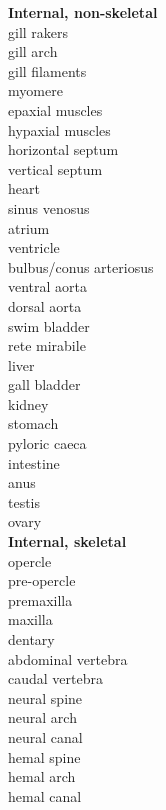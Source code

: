 \documentclass[12pt, hidelinks]{exam}
\begin{document}
\begin{multicols}{3}
\columnbreak\textbf{Internal, non-skeletal} \\
gill rakers \\
gill arch \\
gill filaments \\
myomere \\
epaxial muscles \\
hypaxial muscles \\
horizontal septum \\
vertical septum \\
heart \\
sinus venosus \\
atrium \\
ventricle \\
bulbus/conus arteriosus \\
ventral aorta \\
dorsal aorta \\
swim bladder \\
rete mirabile \\
liver \\
gall bladder \\
kidney \\
stomach \\
pyloric caeca \\
intestine \\
anus \\
testis \\
ovary \\

\columnbreak\textbf{Internal, skeletal} \\
opercle \\
pre-opercle \\
premaxilla \\
maxilla \\
dentary \\
abdominal vertebra \\
caudal vertebra \\
neural spine \\
neural arch \\
neural canal \\
hemal spine \\
hemal arch \\
hemal canal \\
\end{multicols}
\end{document}
